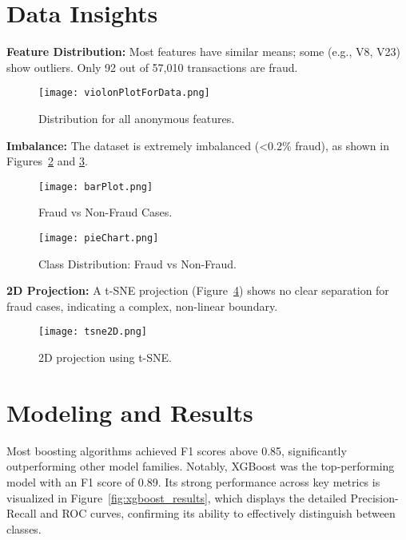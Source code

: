 \documentclass[10pt,a4paper,twocolumn,twoside]{tau-class/tau}
\begin{document}
\section{Data Insights}
\textbf{Feature Distribution:} Most features have similar means; some (e.g., V8, V23) show outliers. Only 92 out of 57,010 transactions are fraud.

\begin{figure}[htbp] %
    \centering
    \texttt{[image: violonPlotForData.png]}
    \caption{Distribution for all anonymous features.}
    \label{fig:distribution-data}
\end{figure}

\textbf{Imbalance:} The dataset is extremely imbalanced (\textless0.2\% fraud), as shown in Figures~\ref{fig:bar-imbalance} and \ref{fig:pie-imbalance}.

\begin{figure}[htbp]
    \centering
    \texttt{[image: barPlot.png]}
    \caption{Fraud vs Non-Fraud Cases.}
    \label{fig:bar-imbalance}
\end{figure}

\begin{figure}[htbp]
    \centering
    \texttt{[image: pieChart.png]}
    \caption{Class Distribution: Fraud vs Non-Fraud.}
    \label{fig:pie-imbalance}
\end{figure}

\textbf{2D Projection:} A t-SNE projection (Figure~\ref{fig:tsne-imbalance}) shows no clear separation for fraud cases, indicating a complex, non-linear boundary.

\begin{figure}[htbp]
    \centering
    \texttt{[image: tsne2D.png]}
    \caption{2D projection using t-SNE.}
    \label{fig:tsne-imbalance}
\end{figure}

\section{Modeling and Results}
Most boosting algorithms achieved F1 scores above 0.85, significantly outperforming other model families. Notably, XGBoost was the top-performing model with an F1 score of 0.89. Its strong performance across key metrics is visualized in Figure~\ref{fig:xgboost_results}, which displays the detailed Precision-Recall and ROC curves, confirming its ability to effectively distinguish between classes.
\end{document}
